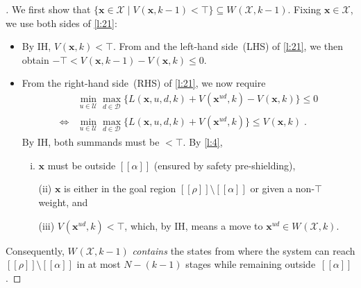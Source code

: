 \documentclass{article}
\newcommand\mkYcAoM[1][]{\mathcal{D}_{#1}}
\newcommand\mpBykPY[1][]{\mathcal{U}_{#1}}
\newcommand\mcrHMQW[1]{[\![#1]\!]}
\newcommand\mijCQyI[1][]{V^{#1}}
\renewcommand\vec[1]{\mathbf{#1}}
\newcommand\mDpbDSN[1][]{W^{#1}}
\begin{document}
{\begin{proof}[]
  We first show that
  $\{{\vec{x}}\in\mathcal{X}\mid
  \mijCQyI({\vec{x}},k-1)<\top\} \subseteq
  \mDpbDSN(\mathcal{X},k-1)$.
  Fixing ${\vec{x}}\in\mathcal{X}$, we use both sides of
  \eqref{l:21}:
  \begin{itemize}
  \item By IH, $\mijCQyI({\vec{x}},k)<\top$.  From
     and the left-hand side~(LHS) of
    \eqref{l:21}, we then obtain
    $-\top<\mijCQyI({\vec{x}},k-1) -
    \mijCQyI({\vec{x}},k)\leq 0$.
  \item 
    From the right-hand side~(RHS) of \eqref{l:21}, we now require
    \begin{align*}
      &\min_{u\in\mpBykPY}
      \max_{d\in\mkYcAoM}
      \big\{
      L({\vec{x}},u,d,k)%
      +
      \mijCQyI({\vec{x}}^{ud},k) -
      \mijCQyI({\vec{x}},k)
      \big\}
      \leq 0
      \\\iff&
      \min_{u\in\mpBykPY}
      \max_{d\in\mkYcAoM}
      \big\{
      L({\vec{x}},u,d,k)%
      +
      \mijCQyI({\vec{x}}^{ud},k)
      \big\}
      \leq\mijCQyI({\vec{x}},k)\;.
    \end{align*}
    By IH, both summands must be $<\top$.  By
    \eqref{l:4},
    \begin{enumerate}[(i)]
    \item ${\vec{x}}$ must be outside $\mcrHMQW\alpha$ (ensured by safety
      pre-shielding),
    \item[(ii)] ${\vec{x}}$ is either in the goal region
      $\mcrHMQW\rho\setminus\mcrHMQW\alpha$ or given a non-$\top$
      weight, and
    \item[(iii)] $\mijCQyI({\vec{x}}^{ud},k)<\top$,
      which, by IH, means a move to
      ${\vec{x}}^{ud}\in\mDpbDSN(\mathcal{X},k)$.
    \end{enumerate}
  \end{itemize}
  Consequently,
  $\mDpbDSN(\mathcal{X},k-1)$
  \emph{contains} the states from where the system can reach
  $\mcrHMQW\rho\setminus\mcrHMQW\alpha$ in at most
  $N-(k-1)$ stages while remaining
  outside~$\mcrHMQW\alpha$.
  \hfill\resizebox{.5em}{.6em}{/\kern-.5em$\Box$}


\end{proof}}
\end{document}

